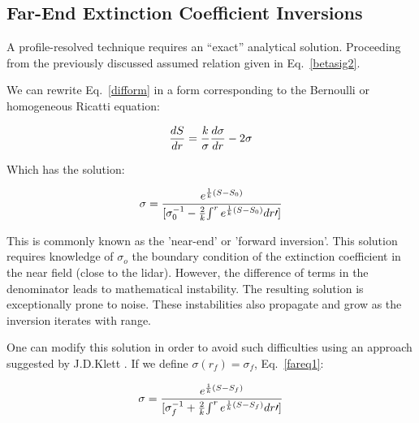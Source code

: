 \subsection{Far-End Extinction Coefficient Inversions}


A profile-resolved technique requires an ``exact'' analytical solution.
Proceeding from the previously discussed assumed relation given in 
Eq.~{\ref{betasig2}}.
%

\noindent
We can rewrite Eq.~{\ref{difform}} in a form
corresponding to the Bernoulli 
or homogeneous Ricatti equation:

\begin{equation}
{dS\over dr}={k\over\sigma}{d\sigma\over dr}-2\sigma
\label{diffeq}
\end{equation}

Which has the solution: 

\begin{equation}
{\sigma} = {e^{{1\over k}(S-S_0)}\over 
{[\sigma_0^{-1}-{2\over k}{\int^r e^{{1\over k}(S-S_0)}dr\prime ]}}}
\label{fareq1}
\end{equation}


This is commonly known as the 'near-end' or 'forward inversion'.
This solution requires knowledge of $\sigma_{o}$ the boundary condition of the extinction
coefficient in the near field (close to the lidar). However, the difference 
of terms in the denominator leads to mathematical instability. 
The resulting solution is exceptionally prone to noise.
These instabilities also propagate 
and grow as the inversion iterates with range.

One can modify this solution in order to avoid such difficulties using
an approach suggested by J.D.Klett \cite{jdk1}.
If we define $\sigma(r_f)=\sigma_f$, Eq.~{\ref{fareq1}}:

\begin{equation}
{\sigma} = {e^{{1\over k}(S-S_f)}\over 
{[\sigma_f^{-1}+{2\over k}{\int^r e^{{1\over k}(S-S_f)}dr\prime ]}}} 
\label{kfee}
\end{equation}

